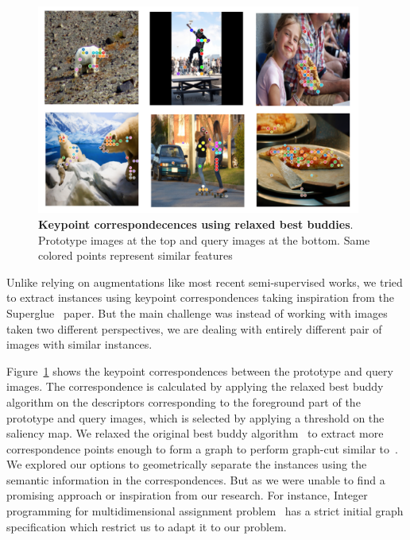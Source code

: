 %
\begin{figure}
	\centering
	\includegraphics[width=0.95\textwidth]{Images/main/correspondences.png}
	\caption[\textbf{Keypoint correspondecences using relaxed best buddies}]{\textbf{Keypoint correspondecences using relaxed best buddies}. Prototype images at the top and query images at the bottom. Same colored points represent similar features }
	\label{fig:correspondecences}
\end{figure}

Unlike relying on augmentations like most recent semi-supervised works, we tried to extract instances using keypoint correspondences taking inspiration from the Superglue~\cite{sarlin2020supergluelearningfeaturematching} paper. But the main challenge was instead of working with images taken two different perspectives, we are dealing with entirely different pair of images with similar instances.

Figure~\ref{fig:correspondecences} shows the keypoint correspondences between the prototype and query images. The correspondence is calculated by applying the relaxed best buddy algorithm on the descriptors corresponding to the foreground part of the prototype and query images, which is selected by applying a threshold on the saliency map. We relaxed the original best buddy algorithm~\cite{Aberman_2018} to extract more correspondence points enough to form a graph to perform graph-cut similar to~\cite{wang2022tokencut, sarlin2020supergluelearningfeaturematching}. We explored our options to geometrically separate the instances using the semantic information in the correspondences. But as we were unable to find a promising approach or inspiration from our research. For instance, Integer programming for multidimensional assignment problem~\cite{WALTEROS2014553} has a strict initial graph specification which restrict us to adapt it to our problem.

